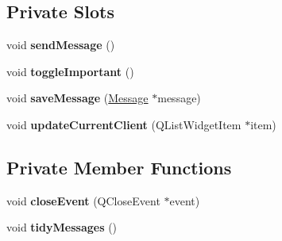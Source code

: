 \subsection*{Private Slots}
\begin{DoxyCompactItemize}
\item 
\hypertarget{class_window_a85e9aae377ed9b8179a162e2a286e7db}{}void {\bfseries send\+Message} ()\label{class_window_a85e9aae377ed9b8179a162e2a286e7db}

\item 
\hypertarget{class_window_adfc7e2bf6ecd158d55025d05d8c45499}{}void {\bfseries toggle\+Important} ()\label{class_window_adfc7e2bf6ecd158d55025d05d8c45499}

\item 
\hypertarget{class_window_abff605e7ff8389da3ee6704e396722d3}{}void {\bfseries save\+Message} (\hyperlink{struct_message}{Message} $\ast$message)\label{class_window_abff605e7ff8389da3ee6704e396722d3}

\item 
\hypertarget{class_window_ac3c08dc3a42a66a69d105d5b8c96c28b}{}void {\bfseries update\+Current\+Client} (Q\+List\+Widget\+Item $\ast$item)\label{class_window_ac3c08dc3a42a66a69d105d5b8c96c28b}

\end{DoxyCompactItemize}
\subsection*{Private Member Functions}
\begin{DoxyCompactItemize}
\item 
\hypertarget{class_window_a45ee5a1dc49aa1847cc190fa99f618ae}{}void {\bfseries close\+Event} (Q\+Close\+Event $\ast$event)\label{class_window_a45ee5a1dc49aa1847cc190fa99f618ae}

\item 
\hypertarget{class_window_aa83b20409c3671cfc97c75a697565140}{}void {\bfseries tidy\+Messages} ()\label{class_window_aa83b20409c3671cfc97c75a697565140}

\end{DoxyCompactItemize}
